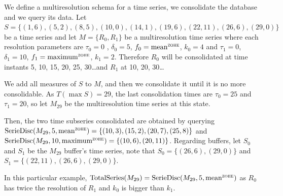 \begin{example}\label{ex:model:smultiresolution}
  We define a multiresolution schema for a time series, we consolidate
  the database and we query its data.  Let $S = \{
  (1,6),(5,2),\allowbreak (8,5),\allowbreak (10,0),\allowbreak
  (14,1),\allowbreak (19,6),\allowbreak (22,11),\allowbreak
  (26,6),(29,0) \}$ be a time series and let $M=\{R_0,R_1\}$ be a
  multiresolution time series where each resolution parameters are
  $\tau_0=0$ , $\delta_0=5$, $f_0 =\meanz$, $k_0=4$ and $\tau_1=0$,
  $\delta_1=10$, $f_1 =\maxz$, $k_1=2$. Therefore $R_0$ will be
  consolidated at time instants 5, 10, 15, 20, 25, 30\dots and $R_1$
  at 10, 20, 30\dots

  We add all measures of $S$ to $M$, and then we consolidate it until
  it is no more consolidable. As $T(\max S)=29$, the last
  consolidation times are $\tau_0=25$ and $\tau_1=20$, so let $M_{29}$
  be the multiresolution time series at this state.

  Then, the two time subseries consolidated are obtained by querying
  $\seriedisc(M_{29},5,\allowbreak \meanz)=\{\allowbreak
  (10,3),\allowbreak (15,\allowbreak 2),\allowbreak (20,7),\allowbreak
  (25,8)\}$ and $\seriedisc(M_{29},\allowbreak 10,\allowbreak \maxz)
  =\allowbreak \{ \allowbreak (10,6),\allowbreak (20,11)\}$. Regarding
  buffers, let $S_0$ and $S_1$ be the $M_{29}$ buffer's time series,
  note that $S_0= \{\allowbreak (26,6),\allowbreak (29,0)\allowbreak
  \}$ and $S_1=\{\allowbreak (22,11),\allowbreak (26,6),(29,0)\}$.

  In this particular example, $ \totalseries(M_{29}) =
  \seriedisc(M_{29},\allowbreak 5,\meanz)$ as $R_0$ has twice the
  resolution of $R_1$ and $k_0$ is bigger than $k_1$.
\end{example}




